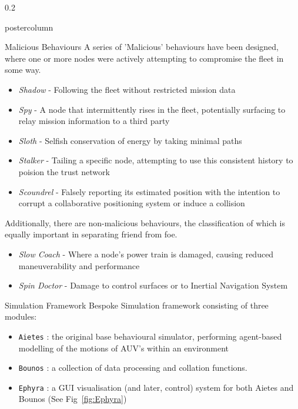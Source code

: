 \documentclass[final,hyperref={pdfpagelabels=false}]{beamer}
\def\colwidth{0.2\linewidth}
\begin{document}
\begin{frame}[fragile]
\begin{columns}[T]
\begin{column}{\colwidth}
\begin{beamercolorbox}[center,wd=\textwidth]{postercolumn}
\begin{minipage}[T]{.98\textwidth}
{            \begin{block}{Malicious Behaviours}
            A series of 'Malicious' behaviours have been designed, where one or more nodes were actively attempting to compromise the fleet in some way.
            \begin{itemize}
              \item \emph{Shadow} - Following the fleet without restricted mission data
              \item \emph{Spy} - A node that intermittently rises in the fleet, potentially surfacing to relay mission information to a third party
              \item \emph{Sloth} - Selfish conservation of energy by taking minimal paths
              \item \emph{Stalker} - Tailing a specific node, attempting to use this consistent history to poision the trust network
              \item \emph{Scoundrel} - Falsely reporting its estimated position with the intention to corrupt a collaborative positioning system or induce a collision
            \end{itemize}

            Additionally, there are non-malicious behaviours, the classification of which is equally important in separating friend from foe.
            \begin{itemize}
              \item \emph{Slow Coach} - Where a node's power train is damaged, causing reduced maneuverability and performance
              \item \emph{Spin Doctor} - Damage to control surfaces or to Inertial Navigation System
            \end{itemize}

          \end{block}

          \iffalse
          \begin{block}{Simulation Framework}
            Bespoke Simulation framework consisting of three modules:
            \begin{itemize}
              \item \texttt{Aietes} : the original base behavioural simulator, performing agent-based modelling of the motions of AUV's within an 
                environment
              \item \texttt{Bounos} : a collection of data processing and collation functions.
              \item \texttt{Ephyra} : a GUI visualisation (and later, control) system for both Aietes and Bounos (See Fig~\ref{fig:Ephyra})
            \end{itemize}


\end{block}}
\end{minipage}
\end{beamercolorbox}
\end{column}
\end{columns}
\end{frame}
\end{document}

